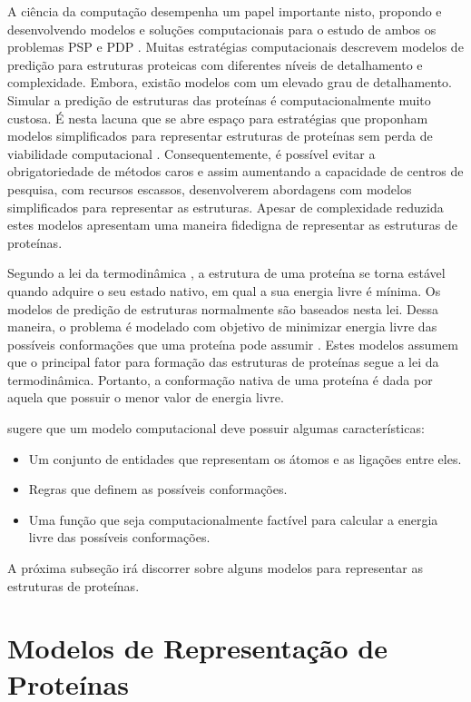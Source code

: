 A ciência da computação desempenha um papel importante nisto, propondo e desenvolvendo modelos e soluções computacionais para o estudo de ambos os problemas PSP e PDP \cite{lopes2008evolutionary}. Muitas estratégias computacionais descrevem modelos de predição para estruturas proteicas com diferentes níveis de detalhamento e complexidade. Embora, existão modelos com um elevado grau de detalhamento. Simular a predição de estruturas das proteínas é computacionalmente muito custosa. É nesta lacuna que se abre espaço para estratégias que proponham modelos simplificados para representar estruturas de proteínas sem perda de viabilidade computacional \cite{benitez2015algoritmo}. Consequentemente, é possível evitar a obrigatoriedade de métodos caros e assim aumentando a capacidade de centros de pesquisa, com recursos escassos, desenvolverem abordagens com modelos simplificados para representar as estruturas. Apesar de complexidade reduzida estes modelos apresentam uma maneira fidedigna de representar as estruturas de proteínas. 


Segundo a lei da termodinâmica \cite{anfinsen1972studies}, a estrutura de uma proteína se torna estável quando adquire o seu estado nativo, em qual a sua energia livre é mínima. Os modelos de predição de estruturas normalmente são baseados nesta lei. Dessa maneira, o problema é modelado com objetivo de minimizar energia livre das possíveis conformações que uma proteína pode assumir \cite{benitez2015algoritmo}. Estes modelos assumem que o principal fator para formação das estruturas de proteínas segue a lei da termodinâmica. Portanto, a conformação nativa de uma proteína é dada por aquela que possuir o menor valor de energia livre.

\cite{pedersen2000algorithms} sugere que um modelo computacional deve possuir algumas características:

\begin{itemize}
	\item Um conjunto de entidades que representam os átomos e as ligações entre eles. 
	\item Regras que definem as possíveis conformações.
	\item Uma função que seja computacionalmente factível para calcular a energia livre das possíveis conformações.
\end{itemize}

A próxima subseção irá discorrer sobre alguns modelos para representar as estruturas de proteínas.

\section{Modelos de Representação de Proteínas}

